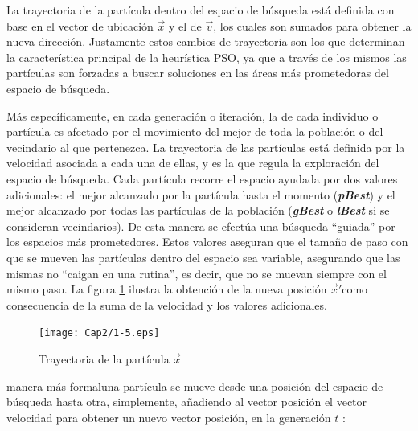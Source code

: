     La trayectoria de la part\'icula dentro del espacio de b\'usqueda est\'a definida con base en el vector de ubicaci\'on $\vec{x}$ 
    y el de \DIFdelbegin {}\DIFdelend \DIFaddbegin {}\DIFaddend $\vec{v}$, los cuales son sumados para obtener la nueva direcci\'on. Justamente estos cambios de trayectoria 
    son los que determinan la caracter\'istica principal de la heur\'istica PSO, ya que a trav\'es de los mismos las part\'iculas son 
    forzadas a buscar soluciones en las \'areas m\'as prometedoras del espacio de b\'usqueda.

    M\'as espec\'ificamente, en cada generaci\'on o iteraci\'on, la \DIFdelbegin {}\DIFdelend \DIFaddbegin {}\DIFaddend de cada individuo o part\'icula es afectado por el movimiento 
    del mejor de toda la poblaci\'on o del vecindario al que pertenezca. La trayectoria de las part\'iculas est\'a definida
    por la velocidad asociada a cada una de ellas, y es la que regula la exploraci\'on del espacio de b\'usqueda. Cada part\'icula 
    recorre el espacio ayudada por dos valores adicionales: el mejor alcanzado por la part\'icula hasta el momento (\textbf{\textit{pBest}}) 
    y el mejor alcanzado por todas las part\'iculas de la poblaci\'on (\textbf{\textit{gBest}} o \textbf{\textit{lBest}} si se consideran 
    vecindarios). De esta manera se efect\'ua una b\'usqueda ``guiada'' por los espacios m\'as prometedores. Estos valores aseguran que 
    el tama\~no de paso con que se mueven las part\'iculas dentro del espacio sea variable, asegurando que las mismas no ``caigan en una rutina'', 
    es decir, que no se muevan siempre con el mismo paso. La figura \ref{fig:trayec} ilustra la obtenci\'on de la nueva posici\'on 
    \DIFaddbegin \DIFadd{(}\DIFaddend $\vec{x}'$\DIFaddbegin {}\DIFaddend como consecuencia de la suma de la velocidad y los valores adicionales.

    \begin{figure}
	\centering
	\texttt{[image: Cap2/1-5.eps]}
	  \caption{Trayectoria de la part\'icula $\vec{x}$}
      \label{fig:trayec}
      \end{figure}

     \DIFdelbegin {}\DIFdelend \DIFaddbegin {}\DIFaddend manera m\'as formal\DIFdelbegin {}\DIFdelend \DIFaddbegin \DIFadd{, }\DIFaddend una part\'icula se mueve desde una posici\'on del espacio de b\'usqueda hasta otra, simplemente, a\~nadiendo 
     al vector posici\'on \DIFdelbegin {}\DIFdelend \DIFaddbegin {}\DIFaddend el vector velocidad \DIFdelbegin {}\DIFdelend \DIFaddbegin {}\DIFaddend para obtener un nuevo vector posici\'on, en la 
     generaci\'on $t$ \DIFaddbegin {}\DIFaddend :

